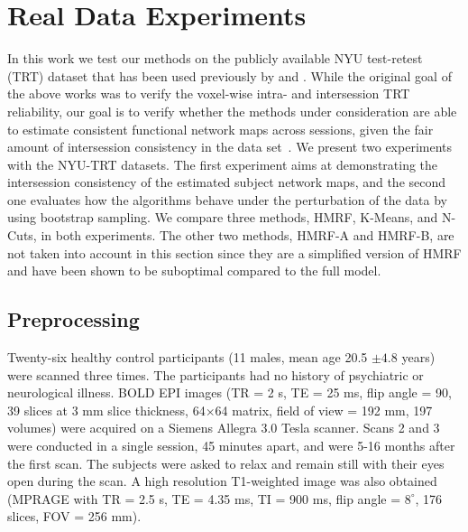 \documentclass[review,authoryear]{elsarticle}
\begin{document}
\section{Real Data Experiments}
\label{sec:realexperiments}
In this work we test our methods on the publicly available NYU test-retest (TRT)
dataset that has been used previously by \citet{shehzad2009resting} and
\citet{zuo2010reliable}. While the original goal of the above works was to
verify the voxel-wise intra- and intersession TRT reliability, our goal is to
verify whether the methods under consideration are able to estimate consistent
functional network maps across sessions, given the fair amount of intersession
consistency in the data
set~\citep{damoiseaux2006consistent,chen2008group,meindl2010test,franco2009interrater}. We
present two experiments with the NYU-TRT datasets. The first experiment aims at
demonstrating the intersession consistency of the estimated subject network
maps, and the second one evaluates how the algorithms behave under the
perturbation of the data by using bootstrap sampling. We compare three methods,
HMRF, K-Means, and N-Cuts, in both experiments. The other two methods, HMRF-A
and HMRF-B, are not taken into account in this section since they are a
simplified version of HMRF and have been shown to be suboptimal compared to the
full model.

\subsection{Preprocessing}
Twenty-six healthy control participants (11 males, mean age 20.5 $\pm 4.8$
years) were scanned three times. The participants had no history
of psychiatric or neurological illness. BOLD EPI images (TR = 2 s, TE = 25 ms,
flip angle = 90, 39 slices at 3 mm slice thickness, 64$\times$64 matrix, field
of view = 192 mm, 197 volumes) were acquired on a Siemens Allegra 3.0 Tesla
scanner. Scans 2 and 3 were conducted in a single session, 45
minutes apart, and were 5-16 months after the first scan. The subjects were
asked to relax and remain still with their eyes open during the scan. A high
resolution T1-weighted image was also obtained (MPRAGE with TR = 2.5 s, TE =
4.35 ms, TI = 900 ms, flip angle = $8^\circ$, 176 slices, FOV = 256 mm).
\end{document}

